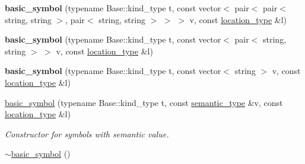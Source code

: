 \begin{DoxyCompactItemize}
\item 
{\bfseries basic\+\_\+symbol} (typename Base\+::kind\+\_\+type t, const vector$<$ pair$<$ pair$<$ string, string $>$, pair$<$ string, string $>$ $>$ $>$ v, const \hyperlink{classyy_1_1spec__parser_aeb5b1e66f65306eca737db5dfa61590d}{location\+\_\+type} \&l)\hypertarget{structyy_1_1spec__parser_1_1basic__symbol_a674e5e011dcd25249b37337d4f26e640}{}\label{structyy_1_1spec__parser_1_1basic__symbol_a674e5e011dcd25249b37337d4f26e640}

\item 
{\bfseries basic\+\_\+symbol} (typename Base\+::kind\+\_\+type t, const vector$<$ pair$<$ string, string $>$ $>$ v, const \hyperlink{classyy_1_1spec__parser_aeb5b1e66f65306eca737db5dfa61590d}{location\+\_\+type} \&l)\hypertarget{structyy_1_1spec__parser_1_1basic__symbol_a94c42f5662cceee317a3663559910580}{}\label{structyy_1_1spec__parser_1_1basic__symbol_a94c42f5662cceee317a3663559910580}

\item 
{\bfseries basic\+\_\+symbol} (typename Base\+::kind\+\_\+type t, const vector$<$ string $>$ v, const \hyperlink{classyy_1_1spec__parser_aeb5b1e66f65306eca737db5dfa61590d}{location\+\_\+type} \&l)\hypertarget{structyy_1_1spec__parser_1_1basic__symbol_a58b81239bc420f7c4e52b7c27e6c3391}{}\label{structyy_1_1spec__parser_1_1basic__symbol_a58b81239bc420f7c4e52b7c27e6c3391}

\item 
\hyperlink{structyy_1_1spec__parser_1_1basic__symbol_aa0ffd098356249a6a6b7f95f02c1db88}{basic\+\_\+symbol} (typename Base\+::kind\+\_\+type t, const \hyperlink{classyy_1_1spec__parser_a92c353b780abe51b48e92c71f7e4e9c8}{semantic\+\_\+type} \&v, const \hyperlink{classyy_1_1spec__parser_aeb5b1e66f65306eca737db5dfa61590d}{location\+\_\+type} \&l)\hypertarget{structyy_1_1spec__parser_1_1basic__symbol_aa0ffd098356249a6a6b7f95f02c1db88}{}\label{structyy_1_1spec__parser_1_1basic__symbol_aa0ffd098356249a6a6b7f95f02c1db88}

\begin{DoxyCompactList}\small\item\em Constructor for symbols with semantic value. \end{DoxyCompactList}\item 
\hyperlink{structyy_1_1spec__parser_1_1basic__symbol_aa6462a3f0778e0f160f322415ea77c4a}{$\sim$basic\+\_\+symbol} ()\hypertarget{structyy_1_1spec__parser_1_1basic__symbol_aa6462a3f0778e0f160f322415ea77c4a}{}\label{structyy_1_1spec__parser_1_1basic__symbol_aa6462a3f0778e0f160f322415ea77c4a}


\end{DoxyCompactItemize}
